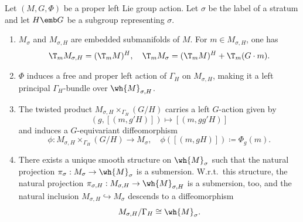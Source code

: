 \begin{prop}[{{\cite[Prop.~6.6.1]{RS1}}}]\label{prop strata}
    Let $(M,G,\Phi)$ be a proper left Lie group action. Let $\sigma$ be the label of a stratum and let $H\emb G$ be a subgroup representing $\sigma$.
    \begin{enumerate}
        \item $M_\sigma$ and $M_{\sigma,H}$ are embedded submanifolds of $M$. For $m\in M_{\sigma,H}$, one has 
        \[\T_m M_{\sigma,H}=(\T_m M)^H,\quad \T_m M_\sigma=(\T_m M)^H+\T_m (G\cdot m).\]
        \item $\Phi$ induces a free and proper left action of $\Gamma_H$ on $M_{\sigma,H}$, making it a left principal $\Gamma_H$-bundle over $\wh{M}_{\sigma,H}$.
        \item The twisted product $M_{\sigma,H}\times_{\Gamma_H}(G\slash H)$ carries a left $G$-action given by 
        \[\left(g,\left[(m,g'H)\right]\right)\mapsto \left[(m,gg'H)\right]\]
        and induces a $G$-equivariant diffeomorphism 
        \[\phi:M_{\sigma,H}\times_{\Gamma_H}(G\slash H)\to M_\sigma,\quad \phi\left(\left[(m,gH)\right]\right)\coloneqq \Phi_g(m).\]
        \item There exists a unique smooth structure on $\wh{M}_\sigma$ such that the natural projection $\pi_\sigma:M_\sigma\to \wh{M}_\sigma$ is a submersion. W.r.t.\ this structure, the natural projection $\pi_{\sigma,H}:M_{\sigma,H}\to \wh{M}_{\sigma,H}$ is a submersion, too, and the natural inclusion $M_{\sigma,H}\hookrightarrow M_\sigma$ descends to a diffeomorphism 
        \[M_{\sigma,H}\slash \Gamma_H\cong \wh{M}_\sigma.\]
    \end{enumerate}
\end{prop}
